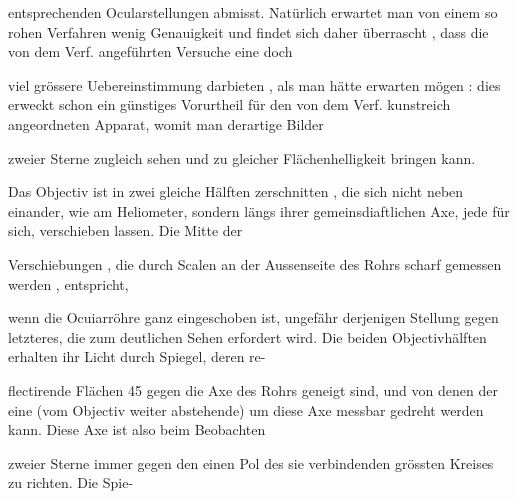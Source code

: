 \documentclass[10pt,a4paper]{article}
\begin{document}
entsprechenden Ocularstellungen abmisst. Natürlich erwartet man von einem so rohen Verfahren wenig Genauigkeit und findet sich daher überrascht , dass die von dem Verf. angeführten Versuche eine doch

viel grössere Uebereinstimmung darbieten , als man hätte erwarten mögen : dies erweckt schon ein günstiges Vorurtheil für den von dem Verf. kunstreich angeordneten Apparat, womit man derartige Bilder

zweier Sterne zugleich sehen und zu gleicher Flächenhelligkeit bringen kann.

Das Objectiv ist in zwei gleiche Hälften zerschnitten , die sich nicht neben einander, wie am Heliometer, sondern längs ihrer gemeinsdiaftlichen Axe, jede für sich, verschieben lassen. Die Mitte der

Verschiebungen , die durch Scalen an der Aussenseite des Rohrs scharf gemessen werden , entspricht,

wenn die Ocuiarröhre ganz eingeschoben ist, ungefähr derjenigen Stellung gegen letzteres, die zum deutlichen Sehen erfordert wird. Die beiden Objectivhälften erhalten ihr Licht durch Spiegel, deren re-

flectirende Flächen 45\textdegree{} gegen die Axe des Rohrs geneigt sind, und von denen der eine (vom Objectiv weiter abstehende) um diese Axe messbar gedreht werden kann. Diese Axe ist also beim Beobachten

zweier Sterne immer gegen den einen Pol des sie verbindenden grössten Kreises zu richten. Die Spie-
\end{document}
